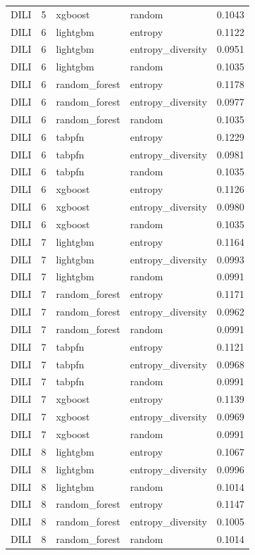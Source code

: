 \begin{tabular}{lrllr}
DILI & 5 & xgboost & random & 0.1043 \\
DILI & 6 & lightgbm & entropy & 0.1122 \\
DILI & 6 & lightgbm & entropy_diversity & 0.0951 \\
DILI & 6 & lightgbm & random & 0.1035 \\
DILI & 6 & random_forest & entropy & 0.1178 \\
DILI & 6 & random_forest & entropy_diversity & 0.0977 \\
DILI & 6 & random_forest & random & 0.1035 \\
DILI & 6 & tabpfn & entropy & 0.1229 \\
DILI & 6 & tabpfn & entropy_diversity & 0.0981 \\
DILI & 6 & tabpfn & random & 0.1035 \\
DILI & 6 & xgboost & entropy & 0.1126 \\
DILI & 6 & xgboost & entropy_diversity & 0.0980 \\
DILI & 6 & xgboost & random & 0.1035 \\
DILI & 7 & lightgbm & entropy & 0.1164 \\
DILI & 7 & lightgbm & entropy_diversity & 0.0993 \\
DILI & 7 & lightgbm & random & 0.0991 \\
DILI & 7 & random_forest & entropy & 0.1171 \\
DILI & 7 & random_forest & entropy_diversity & 0.0962 \\
DILI & 7 & random_forest & random & 0.0991 \\
DILI & 7 & tabpfn & entropy & 0.1121 \\
DILI & 7 & tabpfn & entropy_diversity & 0.0968 \\
DILI & 7 & tabpfn & random & 0.0991 \\
DILI & 7 & xgboost & entropy & 0.1139 \\
DILI & 7 & xgboost & entropy_diversity & 0.0969 \\
DILI & 7 & xgboost & random & 0.0991 \\
DILI & 8 & lightgbm & entropy & 0.1067 \\
DILI & 8 & lightgbm & entropy_diversity & 0.0996 \\
DILI & 8 & lightgbm & random & 0.1014 \\
DILI & 8 & random_forest & entropy & 0.1147 \\
DILI & 8 & random_forest & entropy_diversity & 0.1005 \\
DILI & 8 & random_forest & random & 0.1014 \\

\end{tabular}
